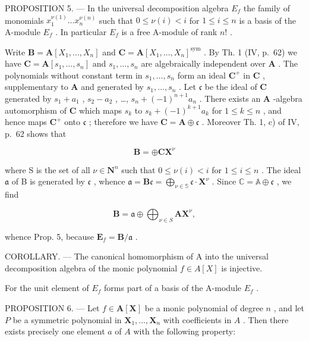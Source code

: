 PROPOSITION 5. --- In the universal decomposition algebra \(E_{f}\) the family of monomials \(x_{1}^{\nu(1)}\ldots x_{n}^{\nu(n)}\) such that \(0 \leqslant \nu(i) < i\) for \(1 \leqslant i \leqslant n\) is a basis of the A-module \(E_{f}\) . In particular \(E_{f}\) is a free A-module of rank \(n!\) .

Write \(\mathbf{B} = \mathbf{A}[X_1, \ldots, X_n]\) and \(\mathbf{C} = \mathbf{A}[X_1, \ldots, X_n]^{\mathrm{sym}}\) . By Th. 1 (IV, p.~62) we have \(\mathbf{C} = \mathbf{A}[s_1, \ldots, s_n]\) and \(s_1, \ldots, s_n\) are algebraically independent over \(\mathbf{A}\) . The polynomials without constant term in \(s_1, \ldots, s_n\) form an ideal \(\mathbf{C}^+\) in \(\mathbf{C}\) , supplementary to \(\mathbf{A}\) and generated by \(s_1, \ldots, s_n\) . Let \(\mathfrak{c}\) be the ideal of \(\mathbf{C}\) generated by \(s_1 + a_1\) , \(s_2 - a_2\) , \ldots, \(s_n + (-1)^{n+1}a_n\) . There exists an \(\mathbf{A}\) -algebra automorphism of \(\mathbf{C}\) which maps \(s_k\) to \(s_k + (-1)^{k+1}a_k\) for \(1 \leqslant k \leqslant n\) , and hence maps \(\mathbf{C}^+\) onto \(\mathfrak{c}\) ; therefore we have \(\mathbf{C} = \mathbf{A} \oplus \mathfrak{c}\) . Moreover Th. 1, c) of IV, p.~62 shows that

\[
\mathbf {B} = \oplus \mathbf {C X} ^ {\nu}
\]

where S is the set of all \(\nu \in \mathbf{N}^n\) such that \(0 \leqslant \nu(i) < i\) for \(1 \leqslant i \leqslant n\) . The ideal \(\mathfrak{a}\) of B is generated by \(\mathfrak{c}\) , whence \(\mathfrak{a} = \mathbf{B}\mathfrak{c} = \bigoplus_{\nu \in \mathbb{S}} \mathfrak{c} \cdot \mathbf{X}^\nu\) . Since \(\mathbb{C} = \mathbb{A} \oplus \mathfrak{c}\) , we find

\[
\mathbf {B} = \mathfrak {a} \oplus \bigoplus_ {\nu \in S} \mathbf {A X} ^ {\nu},
\]

whence Prop. 5, because \(\mathbf{E}_f = \mathbf{B} / \mathfrak{a}\) .

COROLLARY. --- The canonical homomorphism of A into the universal decomposition algebra of the monic polynomial \(f \in A[X]\) is injective.

For the unit element of \(E_{f}\) forms part of a basis of the A-module \(E_{f}\) .

PROPOSITION 6. --- Let \(f \in \mathbf{A}[\mathbf{X}]\) be a monic polynomial of degree \(n\) , and let \(P\) be a symmetric polynomial in \(\mathbf{X}_1, \ldots, \mathbf{X}_n\) with coefficients in \(A\) . Then there exists precisely one element \(a\) of \(A\) with the following property:

